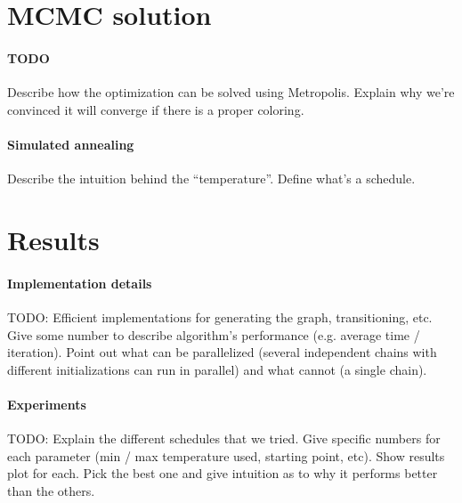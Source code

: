 \documentclass{report}
\begin{document}
  \section*{MCMC solution}
  \paragraph{TODO} Describe how the optimization can be solved using Metropolis. Explain why we're convinced it will converge if there is a proper coloring.

  \paragraph{Simulated annealing}
  Describe the intuition behind the ``temperature''. Define what's a schedule.

  \section*{Results}
  \paragraph{Implementation details}
  TODO: Efficient implementations for generating the graph, transitioning, etc. Give some number to describe algorithm's performance (e.g. average time / iteration). Point out what can be parallelized (several independent chains with different initializations can run in parallel) and what cannot (a single chain).

  \paragraph{Experiments}
  TODO: Explain the different schedules that we tried. Give specific numbers for each parameter (min / max temperature used, starting point, etc). Show results plot for each. Pick the best one and give intuition as to why it performs better than the others.
\end{document}
